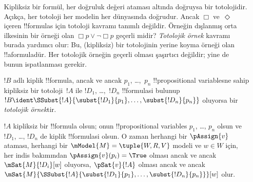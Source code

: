 \documentclass[../../../include/open-logic-section]{subfiles}
\begin{document}


\begin{explain}
Kipliksiz bir formül, her doğruluk değeri ataması altında doğruysa bir
totolojidir. Açıkça, her totoloji her modelin her dünyasında doğrudur. Ancak
$\Box$ ve~$\Diamond$ içeren !!{formula}s için totoloji kavramı tanımlı
değildir. Örneğin dışlanmış orta ilkesinin bir örneği olan $\Box p \lor
\lnot \Box p$ geçerli midir? \emph{Totolojik örnek} kavramı burada yardımcı
olur: Bu, (kipliksiz) bir totolojinin yerine koyma örneği olan
!!a{formula}{}dür. Her totolojik örneğin geçerli olması şaşırtıcı değildir;
yine de bunun ispatlanması gerekir.
\end{explain}

\begin{defn}
  $!B$ adlı kiplik !!{formula}, ancak ve ancak $p_1$, \dots,~$p_n$
  !!{propositional variable}s{}ne sahip kipliksiz bir totoloji~$!A$ ile
  $!D_1$, \dots,~$!D_n$ !!{formula}s{}i bulunup
  $!B \ident \SSubst{!A}{\subst{!D_1}{p_1},
    \dots, \subst{!D_n}{p_n}}$ oluyorsa bir \emph{totolojik örnek}tir.
\end{defn}

\begin{lem}
  $!A$ kipliksiz bir !!{formula} olsun; onun !!{propositional variable}s
  $p_1$, \dots, $p_n$ olsun ve $!D_1$, \dots, $!D_n$ de kiplik
  !!{formula}s{}i olsun.
  O zaman herhangi bir $\pAssign{v}$ ataması, herhangi bir
  $\mModel{M} = \tuple{W, R, V}$ modeli ve $w \in W$ için, her indis bakımından
  $\pAssign{v}(p_i) = \True$ olması ancak ve ancak $\mSat{M}{!D_i}[w]$
  oluyorsa, $\pSat{v}{!A}$ olması ancak ve ancak
  $\mSat{M}{\SSubst{!A}{\subst{!D_1}{p_1}, \dots,
      \subst{!D_n}{p_n}}}[w]$ olur.
\end{lem}
\end{document}
